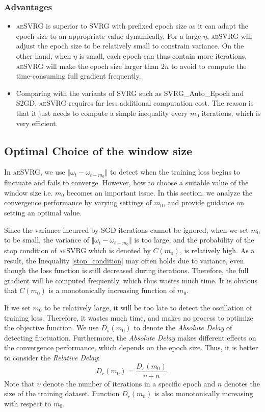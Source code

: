 \documentclass[conference]{IEEEtran}
\begin{document}
\subsubsection{Advantages}
\begin{itemize}
\item \textsc{aeSVRG} is superior to SVRG with prefixed epoch size as it can adapt the epoch size to an appropriate value dynamically. For a large $\eta$, \textsc{aeSVRG} will adjust the epoch size to be relatively small to constrain variance. On the other hand, when $\eta$ is small, each epoch can thus contain more iterations. \textsc{aeSVRG} will make the epoch size larger than $2n$ to avoid to compute the time-consuming full gradient frequently.
\item Comparing with the variants of SVRG such as SVRG\_Auto\_Epoch and S2GD, \textsc{aeSVRG} requires far less additional computation cost. The reason is that it just needs to compute a simple inequality every $m_0$ iterations, which is very efficient.
\end{itemize}
 
 \subsection{Optimal Choice of the window size}
 \label{m0_analysis}
 In \textsc{aeSVRG}, we use $\Vert\omega_{t}-\omega_{t-m_0}\Vert$ to detect when the training loss begins to fluctuate and fails to converge. However, how to choose a suitable value of the window size i.e. $m_0$ becomes an important issue. In this section, we analyze the convergence performance by varying settings of $m_0$, and provide guidance on setting an optimal value.
 
Since the variance incurred by SGD iterations cannot be ignored, when we set $m_0$ to be small, the variance of $\Vert\omega_{t}-\omega_{t-m_0}\Vert$ is too large, and  the probability of the stop condition of \textsc{aeSVRG} which is denoted by $C(m_0)$, is relatively high. As a result, the Inequality \ref{stop_condition} may often holds due to variance, even though the loss function is still decreased during iterations. Therefore, the full gradient will be computed frequently, which thus wastes much time.  It is obvious that $C(m_0)$ is a monotonically increasing function of $m_0$.
 
 If we set $m_0$ to be relatively large, it will be too late to detect the oscillation of training loss. Therefore, it wastes much time, and makes no process to optimize the objective function. We use $D_s(m_0)$ to denote the \emph{Absolute Delay} of detecting fluctuation. Furthermore, the \emph{Absolute Delay} makes different effects on the convergence performance, which  depends on the epoch size. Thus, it is better to consider the \emph{Relative Delay}:
 \begin{equation}
 \label{relative_delay}
 D_r(m_0)=\frac{D_s(m_0)}{\upsilon+n}.
 \end{equation}
 Note that $\upsilon$ denote the number of iterations in a specific epoch and $n$ denotes the size of the training dataset. Function $D_r(m_0)$ is also monotonically increasing with respect to $m_0$.
\end{document}
